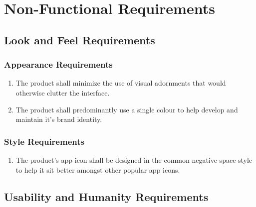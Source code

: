 \documentclass[]{article}
\begin{document}

\section{Non-Functional Requirements}
\label{sec:non-functional_requirements}

\newcommand{\holdEnum}{\setcounter{_enumi}{\value{enumi}}}
\newcommand{\resumeEnum}{\setcounter{enumi}{\value{_enumi}}}

\subsection{Look and Feel Requirements}
\label{sub:look_and_feel_requirements}

\subsubsection{Appearance Requirements}
\label{ssub:appearance_requirements}
\begin{enumerate}[{LF}1. ]
	\item The product shall minimize the use of visual adornments that would otherwise clutter the interface.
	\item The product shall predominantly use a single colour to help develop and maintain it's brand identity.
	\holdEnum
\end{enumerate}

\subsubsection{Style Requirements}
\label{ssub:style_requirements}
\begin{enumerate}[{LF}1.]
	\resumeEnum
	\item The product's app icon shall be designed in the common negative-space style to help it sit better amongst other popular app icons.  
\end{enumerate}


\subsection{Usability and Humanity Requirements}
\label{sub:usability_and_humanity_requirements}
\end{document}

